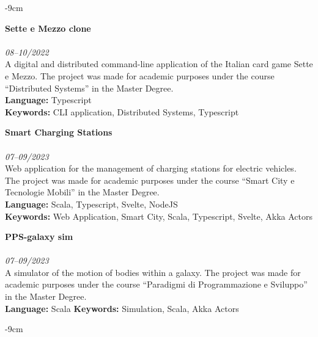 \documentclass[10pt,a4paper]{altacv}
\begin{document}
\begin{adjustwidth}{}{-9cm}
    \divider

    \textbf{Sette e Mezzo clone}\\
    \\
    \textit{08--10/2022}\\ \smallskip
    A digital and distributed command-line application of the Italian card game Sette e Mezzo. The project was made for academic purposes under the course ``Distributed Systems'' in the Master Degree.\\ \smallskip
    \textbf{Language:} Typescript\\
    \textbf{Keywords:} CLI application, Distributed Systems, Typescript

    \divider

    \textbf{Smart Charging Stations}\\
    \\
    \textit{07--09/2023} \\ \smallskip
    Web application for the management of charging stations for electric vehicles. The project was made for academic purposes under the course ``Smart City e Tecnologie Mobili'' in the Master Degree.\\ \smallskip
    \textbf{Language:} Scala, Typescript, Svelte, NodeJS\\
    \textbf{Keywords:} Web Application, Smart City, Scala, Typescript, Svelte, Akka Actors

    \divider

    \textbf{PPS-galaxy sim}\\
    \\
    \textit{07--09/2023} \\ \smallskip
    A simulator of the motion of bodies within a galaxy. The project was made for academic purposes under the course ``Paradigmi di Programmazione e Sviluppo'' in the Master Degree.\\ \smallskip
    \textbf{Language:} Scala
    \textbf{Keywords:} Simulation, Scala, Akka Actors

\end{adjustwidth}

\begin{adjustwidth}{}{-9cm}


    \divider
\end{adjustwidth}
\end{document}
